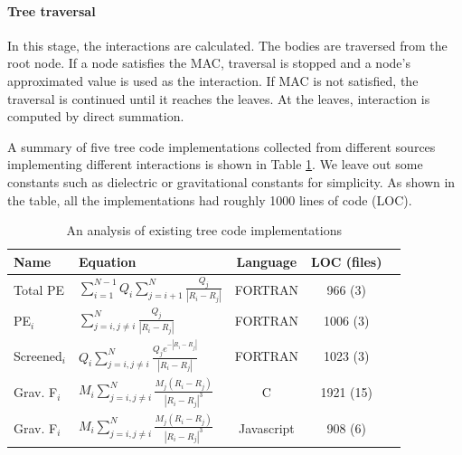 \documentclass[draftclsnofoot]{elsarticle}
\begin{document}
\paragraph{Tree traversal}
In this stage, the interactions are calculated. The bodies are traversed from the root node. If a node satisfies the MAC, traversal is stopped and a node's approximated value
is used as the interaction. If MAC is not satisfied, the traversal is continued until it reaches the leaves. At the leaves, interaction is computed by direct summation.

A summary of five tree code implementations collected from different sources \cite{code1,code2, code3} implementing different
interactions is shown in  Table \ref{tbl_treecodes}. We leave out some constants such as dielectric or gravitational constants for simplicity.
As shown in the table, all the implementations had roughly 1000 lines of code (LOC).  

\begin{table}[!t]
\caption{An analysis of existing tree code implementations}
\label{tbl_treecodes}
\centering
\begin{tabular}{|l|l|c|c|c|}
\hline
Name & Equation & Language & LOC (files) \\
\hline \hline
Total PE
 & $\sum \limits_{i=1}^{N-1} Q_i\sum \limits_{j=i+1}^{N} \frac{Q_j}{|R_i-R_j|}$ & FORTRAN & 966 (3) \\
PE$_i$ &       $  \sum \limits_{j=i, j\ne i}^{N} \frac{Q_j}{|R_i-R_j|}$                              & FORTRAN & 1006 (3) \\
Screened$_i$ &    $Q_i\sum \limits_{j=i, j\ne i}^{N} \frac{Q_je^{-|R_i-R_j|}}{|R_i- R_j|}$ & FORTRAN & 1023 (3) \\
Grav. F$_i$
& $M_i\sum \limits_{j=i, j\ne i}^{N} \frac{M_j{(R_i- R_j)}}{{|R_i-R_j|}^3}$ & C & 1921 (15) \\
Grav. F$_i$
 & $M_i\sum \limits_{j=i, j\ne i}^{N} \frac{M_j{(R_i- R_j)}}{{|R_i-R_j|}^3}$ & Javascript & 908 (6) \\
\hline
\end{tabular}
\end{table}
\end{document}
